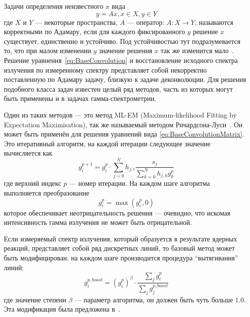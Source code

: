 Задачи определения неизвестного $x$ вида 
\begin{equation*}
  y = A x, x \in X, y \in Y
\end{equation*}
где $X$ и $Y$ --- некоторые пространства, $A$ --- оператор: $ A : X \rightarrow Y $, называются корректными по Адамару, если для каждого фиксированного $y$ решение $x$ существует, единственно и устойчиво. Под устойчивостью тут подразумевается то, что при малом изменении $y$ значение решения $x$ так же изменится мало~\cite{Liskovets1982}. Решение уравнения~\ref{eq:BaseConvolution} и восстановление исходного спектра излучения по измеренному спектру представляет собой некорректно поставленную по Адамару задачу, близкую к задаче деконволюции. Для решения подобного класса задач известен целый ряд методов, часть из которых могут быть применены и в задачах гамма-спектрометрии.

Один из таких методов --- это метод ML-EM (Maximum-likelihood Fitting by Expectation Maximisation), так же называемый методом Ричардсона-Луси~\cite{Vardi1985,Richardson1972,Lucy1974}. Он может быть применён для решения уравнений вида \ref{eq:BaseConvolutionMatrix}.~\cite{Khilkevitch2013,Shevelev2013,Meng2000,Morhac2011} Это итеративный алгоритм, на каждой итерации следующее значение вычисляется как
\begin{equation}
  \label{eq:MlemBase}
  g_i^{p+1} = g_i^p \cdot \sum \limits_{j = 0 }^{N} h_{j,i} \frac{ s_j }{ \sum \limits_{k=0}^{N} h_{j,k} g_k^p }
\end{equation}
где верхний индекс $p$ --- номер итерации. На каждом шаге алгоритма выполняется преобразование 
\begin{equation*}
  g_i^p = \max \left( g_i^p, 0 \right)
\end{equation*}
которое обеспечивает неотрицательность решения --- очевидно, что искомая интенсивность гамма излучения не может быть отрицательной.

Если измеряемый спектр излучения, который образуется в результате ядерных реакций, представляет собой ряд дискретных линий, то базовый метод может быть модифицирован: на каждом шаге производится процедура ``вытягивания'' линий:
\begin{equation}
  \label{eq:BoostMlemDisturb}
  g^{p, boost}_i = \left( g^p_i \right)^{\beta} \cdot \frac{ \sum_j g^p_i }{ \sum_j g^{p, boost}_j }
\end{equation}
где значение степени $\beta$ --- параметр алгоритма, он должен быть чуть больше 1.0. Эта модификация была предложена в~\cite{Morhac2011}.

